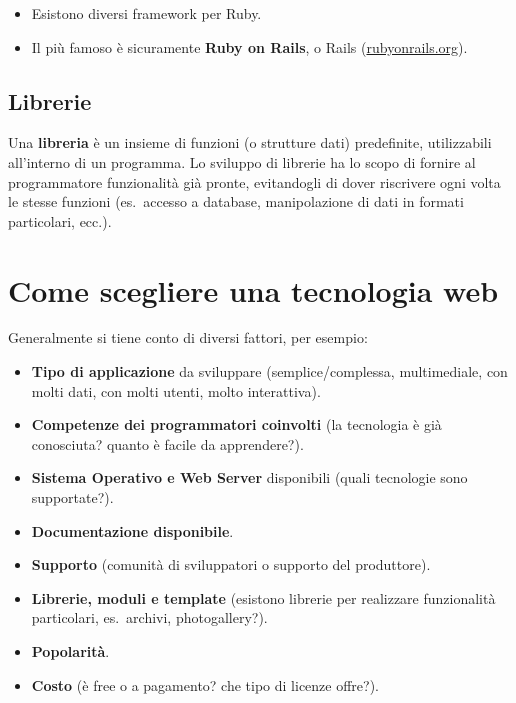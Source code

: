 \begin{itemize}
    \item Esistono diversi framework per Ruby.
    \item Il più famoso è sicuramente \textbf{Ruby on Rails}, o Rails (\url{rubyonrails.org}).
\end{itemize}

\subsection{Librerie}

Una \textbf{libreria} è un insieme di funzioni (o strutture dati) predefinite, utilizzabili all'interno di un programma. Lo sviluppo di librerie ha lo scopo di fornire al programmatore funzionalità già pronte, evitandogli di dover riscrivere ogni volta le stesse funzioni (es.\ accesso a database, manipolazione di dati in formati particolari, ecc.).

\section{Come scegliere una tecnologia web}

Generalmente si tiene conto di diversi fattori, per esempio:

\begin{itemize}
    \item \textbf{Tipo di applicazione} da sviluppare (semplice/complessa, multimediale, con molti dati, con molti utenti, molto interattiva).
    \item \textbf{Competenze dei programmatori coinvolti} (la tecnologia è già conosciuta? quanto è facile da apprendere?).
    \item \textbf{Sistema Operativo e Web Server} disponibili (quali tecnologie sono supportate?).
    \item \textbf{Documentazione disponibile}.
    \item \textbf{Supporto} (comunità di sviluppatori o supporto del produttore).
    \item \textbf{Librerie, moduli e template} (esistono librerie per realizzare funzionalità particolari, es.\ archivi, photogallery?).
    \item \textbf{Popolarità}.
    \item \textbf{Costo} (è free o a pagamento? che tipo di licenze offre?).
\end{itemize}
